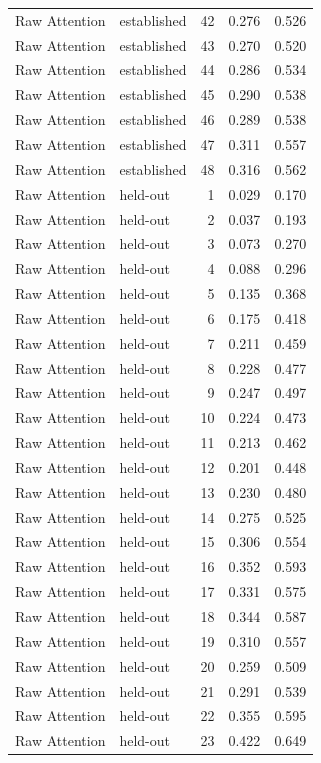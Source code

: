 \begin{tabular}{llrrr}
Raw Attention & established & 42 & 0.276 & 0.526 \\
Raw Attention & established & 43 & 0.270 & 0.520 \\
Raw Attention & established & 44 & 0.286 & 0.534 \\
Raw Attention & established & 45 & 0.290 & 0.538 \\
Raw Attention & established & 46 & 0.289 & 0.538 \\
Raw Attention & established & 47 & 0.311 & 0.557 \\
Raw Attention & established & 48 & 0.316 & 0.562 \\
Raw Attention & held-out & 1 & 0.029 & 0.170 \\
Raw Attention & held-out & 2 & 0.037 & 0.193 \\
Raw Attention & held-out & 3 & 0.073 & 0.270 \\
Raw Attention & held-out & 4 & 0.088 & 0.296 \\
Raw Attention & held-out & 5 & 0.135 & 0.368 \\
Raw Attention & held-out & 6 & 0.175 & 0.418 \\
Raw Attention & held-out & 7 & 0.211 & 0.459 \\
Raw Attention & held-out & 8 & 0.228 & 0.477 \\
Raw Attention & held-out & 9 & 0.247 & 0.497 \\
Raw Attention & held-out & 10 & 0.224 & 0.473 \\
Raw Attention & held-out & 11 & 0.213 & 0.462 \\
Raw Attention & held-out & 12 & 0.201 & 0.448 \\
Raw Attention & held-out & 13 & 0.230 & 0.480 \\
Raw Attention & held-out & 14 & 0.275 & 0.525 \\
Raw Attention & held-out & 15 & 0.306 & 0.554 \\
Raw Attention & held-out & 16 & 0.352 & 0.593 \\
Raw Attention & held-out & 17 & 0.331 & 0.575 \\
Raw Attention & held-out & 18 & 0.344 & 0.587 \\
Raw Attention & held-out & 19 & 0.310 & 0.557 \\
Raw Attention & held-out & 20 & 0.259 & 0.509 \\
Raw Attention & held-out & 21 & 0.291 & 0.539 \\
Raw Attention & held-out & 22 & 0.355 & 0.595 \\
Raw Attention & held-out & 23 & 0.422 & 0.649 \\

\end{tabular}
